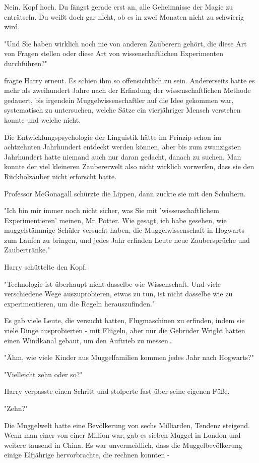{Nein. Kopf hoch. Du fängst gerade erst an, alle Geheimnisse der Magie zu enträtseln. Du weißt doch gar nicht, ob es in zwei Monaten nicht zu schwierig wird.

"Und Sie haben wirklich noch nie von anderen Zauberern gehört, die diese Art von Fragen stellen oder diese Art von wissenschaftlichen Experimenten durchführen?"

fragte Harry erneut. Es schien ihm so offensichtlich zu sein. Andererseits hatte es mehr als zweihundert Jahre nach der Erfindung der wissenschaftlichen Methode gedauert, bis irgendein Muggelwissenschaftler auf die Idee gekommen war, systematisch zu untersuchen, welche Sätze ein vierjähriger Mensch verstehen konnte und welche nicht.

Die Entwicklungspsychologie der Linguistik hätte im Prinzip schon im achtzehnten Jahrhundert entdeckt werden können, aber bis zum zwanzigsten Jahrhundert hatte niemand auch nur daran gedacht, danach zu suchen. Man konnte der viel kleineren Zaubererwelt also nicht wirklich vorwerfen, dass sie den Rückholzauber nicht erforscht hatte.

Professor McGonagall schürzte die Lippen, dann zuckte sie mit den Schultern.

"Ich bin mir immer noch nicht sicher, was Sie mit 'wissenschaftlichem Experimentieren' meinen, Mr~Potter. Wie gesagt, ich habe gesehen, wie muggelstämmige Schüler versucht haben, die Muggelwissenschaft in Hogwarts zum Laufen zu bringen, und jedes Jahr erfinden Leute neue Zaubersprüche und Zaubertränke."

Harry schüttelte den Kopf.

"Technologie ist überhaupt nicht dasselbe wie Wissenschaft. Und viele verschiedene Wege auszuprobieren, etwas zu tun, ist nicht dasselbe wie zu experimentieren, um die Regeln herauszufinden."

Es gab viele Leute, die versucht hatten, Flugmaschinen zu erfinden, indem sie viele Dinge ausprobierten - mit Flügeln, aber nur die Gebrüder Wright hatten einen Windkanal gebaut, um den Auftrieb zu messen…

"Ähm, wie viele Kinder aus Muggelfamilien kommen jedes Jahr nach Hogwarts?"

"Vielleicht zehn oder so?"

Harry verpasste einen Schritt und stolperte fast über seine eigenen Füße.

"Zehn?"

Die Muggelwelt hatte eine Bevölkerung von sechs Milliarden, Tendenz steigend. Wenn man einer von einer Million war, gab es sieben Muggel in London und weitere tausend in China. Es war unvermeidlich, dass die Muggelbevölkerung einige Elfjährige hervorbrachte, die rechnen konnten -

}
